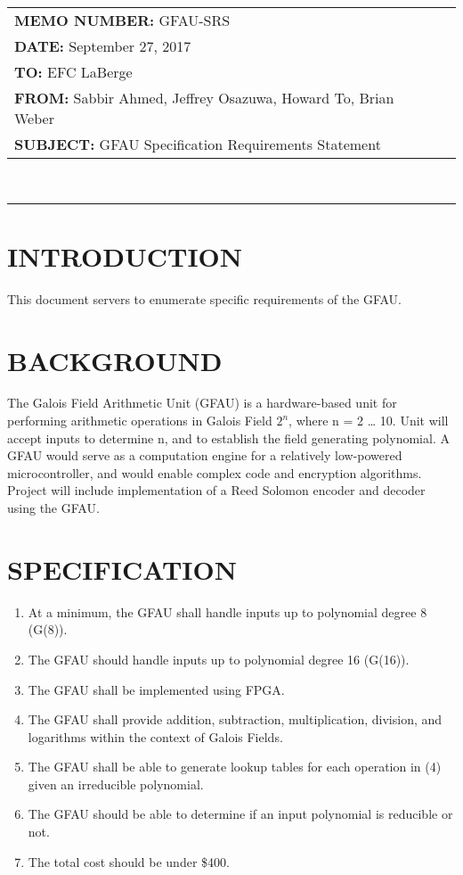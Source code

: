 \documentclass[paper=usletter, fontsize=12pt]{article}
\newcommand{\Sabbir}{Sabbir Ahmed}
\newcommand{\Jeffrey}{Jeffrey Osazuwa}
\newcommand{\Howard}{Howard To}
\newcommand{\Brian}{Brian Weber}
\newcommand{\documentinfo}[5]{
    \begin{centering}
        \parbox{6.8in}{
        \begin{spacing}{1}
            \begin{flushleft}
                \begin{tabular}{l l}
                    #1 \\
                    #2 \\
                    #3 \\
                    #4 \\
                    #5 \\
                \end{tabular}\\
                \rule{\textwidth}{1pt}
            \end{flushleft}
        \end{spacing}
        }
    \end{centering}
}
\begin{document}
 \documentinfo{\textbf{MEMO NUMBER:} GFAU-SRS}{\textbf{DATE:}  {September 27, 2017}}{\textbf{TO: } EFC LaBerge}{\textbf{FROM: }\Sabbir, \Jeffrey, \Howard, \Brian}{\textbf{SUBJECT: } GFAU Specification Requirements Statement}
    \vspace{-0.3in}


	\section{INTRODUCTION}
		This document servers to enumerate specific requirements of the GFAU.

	\section{BACKGROUND}

The Galois Field Arithmetic Unit (GFAU) is a hardware-based unit for performing arithmetic operations in Galois Field $2^n$, where n = 2 … 10. Unit will accept inputs to determine n, and to establish the field generating polynomial. A GFAU would serve as a computation engine for a relatively low-powered microcontroller, and would enable complex code and encryption algorithms. Project will include implementation of a Reed Solomon encoder and decoder using the GFAU.

	\section{SPECIFICATION}

	\begin{enumerate}
		
		\item At a minimum, the GFAU shall handle inputs up to polynomial degree 8 (G(8)).
		\item The GFAU should handle inputs up to polynomial degree 16 (G(16)).
		\item The GFAU shall be implemented using FPGA.
		\item The GFAU shall provide addition, subtraction, multiplication, division, and logarithms within the context of Galois Fields.
		\item The GFAU shall be able to generate lookup tables for each operation in (4) given an irreducible polynomial.
		\item The GFAU should be able to determine if an input polynomial is reducible or not.
		\item The total cost should be under \$400.




	\end{enumerate}
\end{document}
